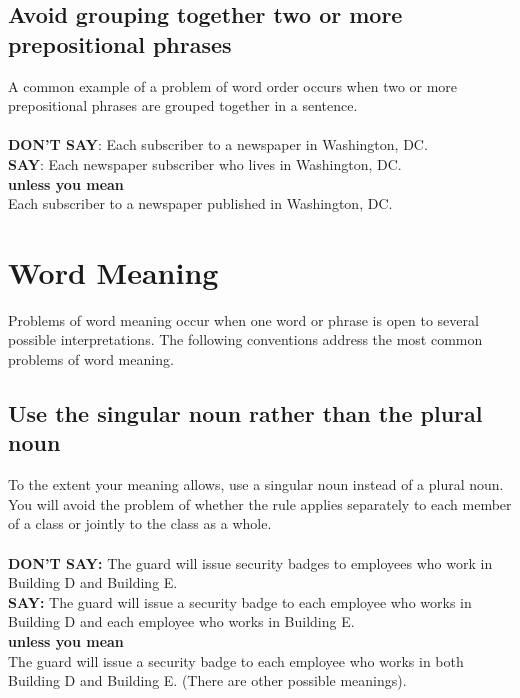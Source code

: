 \documentclass[12pt, letterpaper]{report}
\begin{document}
\begin{linenumbers}
            \subsection{Avoid grouping together two or more prepositional phrases} 
                A common example of a problem of word order occurs when two or more prepositional phrases are grouped together in a sentence.\\\\
                \textbf{DON'T SAY}: Each subscriber to a newspaper in Washington, DC.\\
                \textbf{SAY}: Each newspaper subscriber who lives in Washington, DC.\\
                \textbf{unless you mean}\\
                Each subscriber to a newspaper published in Washington, DC.
        \section{Word Meaning}
        Problems of word meaning occur when one word or phrase is open to several possible interpretations. The following conventions address the most common problems of word meaning.
            \subsection{Use the singular noun rather than the plural noun} 
                To the extent your meaning allows, use a singular noun instead of a plural noun. You will avoid the problem of whether the rule applies separately to each member of a class or jointly to the class as a whole.\\\\
                \textbf{DON'T SAY:} The guard will issue security badges to employees who work in Building D and Building E. \\
                \textbf{SAY:} The guard will issue a security badge to each employee who works in Building D and each employee who works in Building E.\\
                \textbf{unless you mean}\\
                The guard will issue a security badge to each employee who works in both Building D and Building E. (There are other possible meanings). 

\end{linenumbers}
\end{document}
